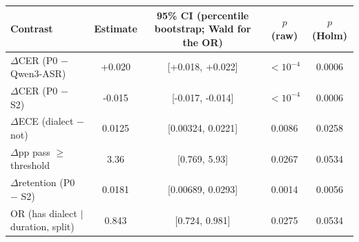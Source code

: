 \begin{tabular}{lcccc}
\toprule
Contrast & Estimate & 95\% CI (percentile bootstrap; Wald for the OR) & $p$ (raw) & $p$ (Holm) \\
\midrule
$\Delta$CER (P0 $-$ Qwen3-ASR) & +0.020 & [+0.018, +0.022] & $<10^{-4}$ & 0.0006 \\
$\Delta$CER (P0 $-$ S2) & -0.015 & [-0.017, -0.014] & $<10^{-4}$ & 0.0006 \\
$\Delta$ECE (dialect $-$ not) & 0.0125 & [0.00324, 0.0221] & 0.0086 & 0.0258 \\
$\Delta$pp pass $\geq$ threshold & 3.36 & [0.769, 5.93] & 0.0267 & 0.0534 \\
$\Delta$retention (P0 $-$ S2) & 0.0181 & [0.00689, 0.0293] & 0.0014 & 0.0056 \\
OR (has dialect $\mid$ duration, split) & 0.843 & [0.724, 0.981] & 0.0275 & 0.0534 \\
\bottomrule
\end{tabular}
\par\vspace{2pt}{\small $\Delta$pp $p$ is a within-split permutation $p$.}
